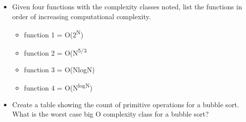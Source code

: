 \begin{itemize}
{ What is the worst case scenario for these algorithms?  For each algorithm, how many questions will be asked in the worst case?    What is the Big O complexity class for each algorithm?
 }
 \item {Given four functions with the complexity classes noted,  list the functions in order of increasing computational complexity.
 \begin{itemize}
 \item function 1 = O(2\textsuperscript{N})
 \item function 2 = O(N\textsuperscript{5/3}
 \item function 3 = O(NlogN)
 \item function 4 = O(N\textsuperscript{logN})
 \end{itemize}
 }

\item Create a table showing the count of primitive operations for a bubble sort.  What is the worst case big O complexity class for a bubble sort?
\end{itemize}

